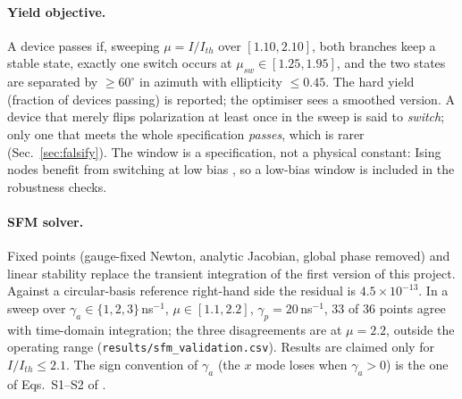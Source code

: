\documentclass[10pt]{article}
\begin{document}
\paragraph{Yield objective.} A device passes if, sweeping $\mu=I/I_{th}$ over $[1.10,2.10]$, both branches keep a stable state, exactly one switch occurs at $\mu_{sw}\in[1.25,1.95]$, and the two states are separated by $\ge60^\circ$ in azimuth with ellipticity $\le0.45$.
The hard yield (fraction of devices passing) is reported; the optimiser sees a smoothed version. A device that merely flips polarization at least once in the sweep is said to \emph{switch}; only one that meets the whole specification \emph{passes}, which is rarer (Sec.~\ref{sec:falsify}). The window is a specification, not a physical constant: Ising nodes benefit from switching at low bias \cite{yuan2025apl126}, so a low-bias window is included in the robustness checks.
\paragraph{SFM solver.} Fixed points (gauge-fixed Newton, analytic Jacobian, global phase removed) and linear stability replace the transient integration of the first version of this project. Against a circular-basis reference right-hand side the residual is $4.5\times10^{-13}$.
In a sweep over $\gamma_a\in\{1,2,3\}$\,ns$^{-1}$, $\mu\in[1.1,2.2]$, $\gamma_p=20$\,ns$^{-1}$, 33 of 36 points agree with time-domain integration; the three disagreements are at $\mu=2.2$, outside the operating range
(\texttt{results/sfm\_validation.csv}). Results are claimed only for $I/I_{th}\le2.1$. The sign convention of $\gamma_a$ (the $x$ mode loses when $\gamma_a>0$) is the one of Eqs.~S1--S2 of \cite{chen2026meta}.
\end{document}
